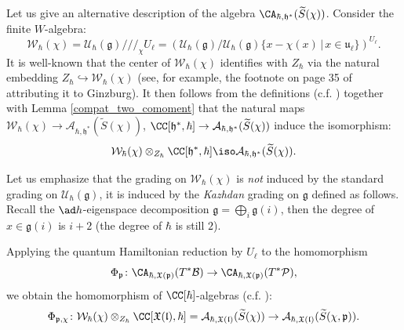 \documentclass[12pt]{amsart}
\begin{document}
Let us give an alternative description of the algebra $\CA_{\hbar,\mathfrak{h}^*}(\widetilde{S}(\chi))$. 
Consider the finite $W$-algebra: 
\begin{equation*}
\mathcal{W}_\hbar(\chi)=\mathcal{U}_\hbar(\mathfrak{g})/\!/\!/_{\chi}U_{\ell}=(\mathcal{U}_\hbar(\mathfrak{g})/\mathcal{U}_\hbar(\mathfrak{g})\{x-\chi(x)\,|\, x \in \mathfrak{u}_{\ell}\})^{U_\ell}.
\end{equation*} 
It is well-known that the center of $\mathcal{W}_\hbar(\chi)$ identifies with $Z_\hbar$ via the natural embedding $Z_{\hbar} \hookrightarrow \mathcal{W}_\hbar(\chi)$ (see, for example,  the footnote on page 35 of \cite{Premetstabilizer} attributing it to Ginzburg). It then follows from the definitions (c.f. \cite[Section 5.1]{Losev_isofquant}) together with Lemma \ref{compat_two_comoment} that the natural maps $\mathcal{W}_\hbar(\chi) \rightarrow \mathcal{A}_{\hbar,\mathfrak{h}^*}(\widetilde{S}(\chi))$, $\CC[\mathfrak{h}^*,\hbar] \rightarrow \mathcal{A}_{\hbar,\mathfrak{h}^*}(\widetilde{S}(\chi))$ induce the isomorphism:
\begin{equation*}
\mathcal{W}_{\hbar}(\chi) \otimes_{Z_\hbar} \CC[\mathfrak{h}^*,\hbar] \iso \mathcal{A}_{\hbar,\mathfrak{h}^*}(\widetilde{S}(\chi)).
\end{equation*}




\begin{warning}
Let us emphasize that the grading on     $\mathcal{W}_{\hbar}(\chi)$ is {\emph{not}} induced by the standard grading on $\mathcal{U}_\hbar(\mathfrak{g})$, it is induced by the {\emph{Kazhdan}} grading on $\mathfrak{g}$ defined as follows. Recall the $\ad h$-eigenspace decomposition $\mathfrak{g}=\bigoplus_{i}\mathfrak{g}(i)$, then the degree of $x \in \mathfrak{g}(i)$ is $i+2$ (the degree of $\hbar$ is still $2$).
\end{warning}





Applying the quantum Hamiltonian reduction by $U_\ell$ to the homomorphism 
\begin{equation*}
\Phi_{\mathfrak{p}}\colon \CA_{\hbar,\mathfrak{X}(\mathfrak{p})}(T^*\mathcal{B}) \rightarrow \CA_{\hbar,\mathfrak{X}(\mathfrak{p})}(T^*\mathcal{P}),
\end{equation*}
we obtain the homomorphism of $\CC[\hbar]$-algebras (c.f. \cite[Lemma 5.2.1 (3)]{Losev_isofquant}):
\begin{equation*}
\Phi_{\mathfrak{p},\chi}\colon \mathcal{W}_{\hbar}(\chi) \otimes_{Z_\hbar} \CC[\mathfrak{X}(\mathfrak{l}),\hbar]=\mathcal{A}_{\hbar,\mathfrak{X}(\mathfrak{l})}(\widetilde{S}(\chi)) \rightarrow \mathcal{A}_{\hbar,\mathfrak{X}(\mathfrak{l})}(\widetilde{S}(\chi,\mathfrak{p})).
\end{equation*}
\end{document}
